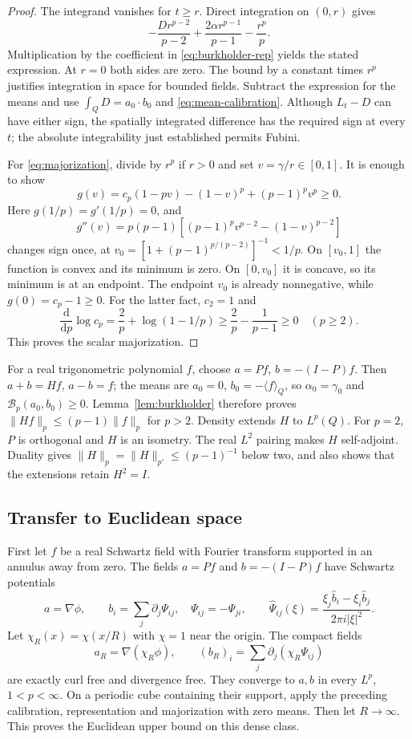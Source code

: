 \documentclass[11pt,a4paper]{article}
\numberwithin{equation}{section}
\theoremstyle{definition}
\theoremstyle{remark}\newtheorem{remark}[theorem]{Remark}
\newcommand{\Id}{I}
\newcommand{\mean}[2]{\langle #1\rangle_{#2}}
\newcommand{\norm}[1]{\lVert #1\rVert}
\begin{document}
\begin{proof}
The integrand vanishes for \(t\geq r\). Direct integration on \((0,r)\)
gives
\[
 -\frac{D r^{p-2}}{p-2}
 +\frac{2\alpha r^{p-1}}{p-1}-\frac{r^p}p.
\]
Multiplication by the coefficient in \eqref{eq:burkholder-rep} yields
the stated expression. At \(r=0\) both sides are zero.
The bound by a constant times \(r^p\) justifies integration in space
for bounded fields. Subtract the expression for the means and use
\(\int_QD=a_0\cdot b_0\) and \eqref{eq:mean-calibration}.
Although \(L_t-D\) can have either sign, the spatially integrated
difference has the required sign at every \(t\); the absolute
integrability just established permits Fubini.

For \eqref{eq:majorization}, divide by \(r^p\) if \(r>0\) and set
\(v=\gamma/r\in[0,1]\). It is enough to show
\[
 g(v)=c_p(1-pv)-(1-v)^p+(p-1)^pv^p\geq0.
\]
Here \(g(1/p)=g'(1/p)=0\), and
\[
 g''(v)=p(p-1)[(p-1)^pv^{p-2}-(1-v)^{p-2}]
\]
changes sign once, at
\(v_0=[1+(p-1)^{p/(p-2)}]^{-1}<1/p\).
On \([v_0,1]\) the function is convex and its minimum is zero.
On \([0,v_0]\) it is concave, so its minimum is at an endpoint.
The endpoint \(v_0\) is already nonnegative, while \(g(0)=c_p-1\geq0\).
For the latter fact, \(c_2=1\) and
\[
 \frac{\mathrm d}{\mathrm dp}\log c_p
 =\frac2p+\log(1-1/p)
 \geq\frac2p-\frac1{p-1}\geq0\quad(p\geq2).
\]
This proves the scalar majorization.
\end{proof}

For a real trigonometric polynomial \(f\), choose
\(a=Pf\), \(b=-(\Id-P)f\). Then \(a+b=Hf\), \(a-b=f\);
the means are \(a_0=0\), \(b_0=-\mean fQ\), so
\(\alpha_0=\gamma_0\) and \(\mathcal B_p(a_0,b_0)\geq0\).
Lemma~\ref{lem:burkholder} therefore proves
\(\norm{Hf}_p\leq(p-1)\norm f_p\) for \(p>2\).
Density extends \(H\) to \(L^p(Q)\).
For \(p=2\), \(P\) is orthogonal and \(H\) is an isometry.
The real \(L^2\) pairing makes \(H\) self-adjoint. Duality gives
\(\norm H_p=\norm H_{p'}\leq(p-1)^{-1}\) below two, and also shows
that the extensions retain \(H^2=\Id\).

\subsection{Transfer to Euclidean space}

First let \(f\) be a real Schwartz field with Fourier transform supported
in an annulus away from zero. The fields \(a=Pf\) and
\(b=-(\Id-P)f\) have Schwartz potentials
\[
 a=\nabla\phi,\qquad b_i=\sum_j\partial_j\Psi_{ij},\quad
 \Psi_{ij}=-\Psi_{ji},\qquad
 \widehat\Psi_{ij}(\xi)
 =\frac{\xi_j\widehat b_i-\xi_i\widehat b_j}{2\pi i|\xi|^2}.
\]
Let \(\chi_R(x)=\chi(x/R)\) with \(\chi=1\) near the origin.
The compact fields
\[
 a_R=\nabla(\chi_R\phi),\qquad
 (b_R)_i=\sum_j\partial_j(\chi_R\Psi_{ij})
\]
are exactly curl free and divergence free. They converge to \(a,b\)
in every \(L^p\), \(1<p<\infty\). On a periodic cube containing
their support, apply the preceding calibration, representation and
majorization with zero means. Then let \(R\to\infty\).
This proves the Euclidean upper bound on this dense class.
\end{document}
